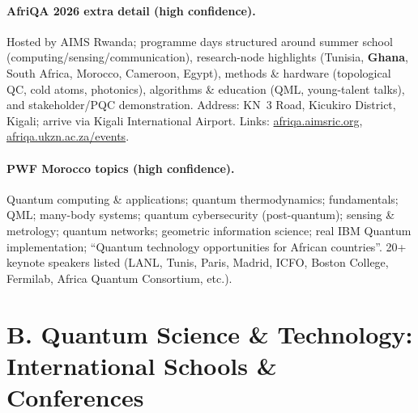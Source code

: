 \documentclass[11pt,a4paper]{article}
\begin{document}
\paragraph{AfriQA 2026 extra detail (high confidence).}
Hosted by AIMS Rwanda; programme days structured around summer school (computing/sensing/communication), research-node highlights (Tunisia, \textbf{Ghana}, South Africa, Morocco, Cameroon, Egypt), methods \& hardware (topological QC, cold atoms, photonics), algorithms \& education (QML, young-talent talks), and stakeholder/PQC demonstration. Address: KN~3 Road, Kicukiro District, Kigali; arrive via Kigali International Airport. Links: \href{https://afriqa.aimsric.org/}{afriqa.aimsric.org}, \href{https://afriqa.ukzn.ac.za/events/}{afriqa.ukzn.ac.za/events}.

\paragraph{PWF Morocco topics (high confidence).} Quantum computing \& applications; quantum thermodynamics; fundamentals; QML; many-body systems; quantum cybersecurity (post-quantum); sensing \& metrology; quantum networks; geometric information science; real IBM Quantum implementation; ``Quantum technology opportunities for African countries''. 20+ keynote speakers listed (LANL, Tunis, Paris, Madrid, ICFO, Boston College, Fermilab, Africa Quantum Consortium, etc.).

\section{B. Quantum Science \& Technology: International Schools \& Conferences}
\end{document}

